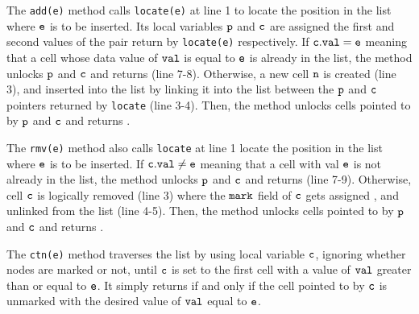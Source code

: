  


The {\tt add(e)} method calls {\tt locate(e)} at line 1 to locate the position in the list where $\tt e$ is to be inserted. Its local variables $\tt p$ and $\tt c$ are assigned the first and second values of the pair return by {\tt locate(e)} respectively. If $\tt c.val = e$ meaning that a cell whose data value of $\tt val$ is equal to $\tt e$ is already in the list, the method unlocks $\tt p$ and $\tt c$ and returns \false \; (line 7-8). Otherwise, a new cell $\tt n$ is created (line 3), and inserted into the list by linking it into the list between the $\tt p$ and $\tt c$ pointers returned by
{\tt locate} (line 3-4). Then, the method unlocks cells pointed to by $\tt p$ and $\tt c$ and returns \true.  

The {\tt rmv(e)} method also calls {\tt locate} at line 1 locate the position in the list where $\tt e$ is to be inserted. If $\tt c.val \neq e$ meaning that a cell with val $\tt e$ is not already in the list, the method unlocks $\tt p$ and $\tt c$ and returns \false (line 7-9). Otherwise, cell $\tt c$ is logically removed (line 3) where the $\tt mark$ field of $\tt c$ gets assigned \true, and unlinked from the list (line 4-5). Then, the method unlocks cells pointed to by $\tt p$ and $\tt c$ and returns \true.  

The {\tt ctn(e)} method traverses the list by using local variable $\tt c$, ignoring whether nodes are marked or not, until $\tt c$ is set to the
first cell with a value of $\tt val$ greater than or equal to $\tt e$. It simply returns \true \; if and only if the cell pointed to by $\tt c$  is unmarked with the desired value of $\tt val$ equal to $\tt e$. 
